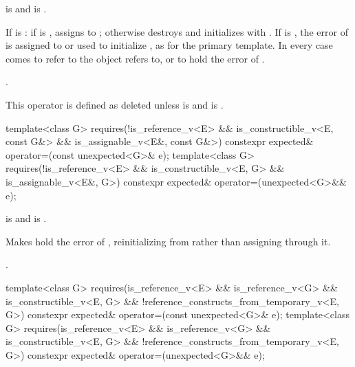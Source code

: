 \begin{itemdescr}
\pnum
\constraints
{} is  and  is .

\pnum
\effects
If  is : if  is , assigns  to ; otherwise destroys  and initializes  with . If  is , the error of  is assigned to or used to initialize , as for the primary template. In every case  comes to refer to the object  refers to, or to hold the error of .

\pnum
\returns
{}.

\pnum
\remarks
This operator is defined as deleted unless  is  and  is .
\end{itemdescr}

%
\begin{itemdecl}
template<class G>
  requires(!is_reference_v<E> && is_constructible_v<E, const G&> &&
           is_assignable_v<E&, const G&>)
constexpr expected& operator=(const unexpected<G>& e);
template<class G>
  requires(!is_reference_v<E> && is_constructible_v<E, G> && is_assignable_v<E&, G>)
constexpr expected& operator=(unexpected<G>&& e);
\end{itemdecl}

\begin{itemdescr}
\pnum
\constraints
{} is  and  is .

\pnum
\effects
Makes  hold the error of , reinitializing  from  rather than assigning through it.

\pnum
\returns
{}.
\end{itemdescr}

%
\begin{itemdecl}
template<class G>
  requires(is_reference_v<E> && is_reference_v<G> && is_constructible_v<E, G> &&
           !reference_constructs_from_temporary_v<E, G>)
constexpr expected& operator=(const unexpected<G>& e);
template<class G>
  requires(is_reference_v<E> && is_reference_v<G> && is_constructible_v<E, G> &&
           !reference_constructs_from_temporary_v<E, G>)
constexpr expected& operator=(unexpected<G>&& e);
\end{itemdecl}

